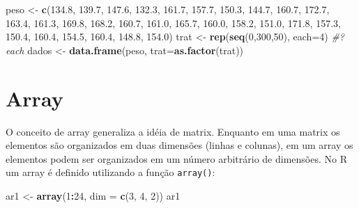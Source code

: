 \documentclass[
]{book}
\newenvironment{Shaded}{\begin{snugshade}}{\end{snugshade}}
\newcommand{\CommentTok}[1]{\textcolor[rgb]{0.56,0.35,0.01}{\textit{#1}}}
\newcommand{\DataTypeTok}[1]{\textcolor[rgb]{0.13,0.29,0.53}{#1}}
\newcommand{\DecValTok}[1]{\textcolor[rgb]{0.00,0.00,0.81}{#1}}
\newcommand{\FloatTok}[1]{\textcolor[rgb]{0.00,0.00,0.81}{#1}}
\newcommand{\KeywordTok}[1]{\textcolor[rgb]{0.13,0.29,0.53}{\textbf{#1}}}
\newcommand{\NormalTok}[1]{#1}
\newcommand{\OperatorTok}[1]{\textcolor[rgb]{0.81,0.36,0.00}{\textbf{#1}}}
\newcommand{\StringTok}[1]{\textcolor[rgb]{0.31,0.60,0.02}{#1}}
\begin{document}
\begin{Shaded}
\begin{Highlighting}[]
\NormalTok{peso  <-}\StringTok{ }\KeywordTok{c}\NormalTok{(}\FloatTok{134.8}\NormalTok{, }\FloatTok{139.7}\NormalTok{, }\FloatTok{147.6}\NormalTok{, }\FloatTok{132.3}\NormalTok{, }\FloatTok{161.7}\NormalTok{, }\FloatTok{157.7}\NormalTok{, }\FloatTok{150.3}\NormalTok{, }\FloatTok{144.7}\NormalTok{,}
           \FloatTok{160.7}\NormalTok{, }\FloatTok{172.7}\NormalTok{, }\FloatTok{163.4}\NormalTok{, }\FloatTok{161.3}\NormalTok{, }\FloatTok{169.8}\NormalTok{, }\FloatTok{168.2}\NormalTok{, }\FloatTok{160.7}\NormalTok{, }\FloatTok{161.0}\NormalTok{,}
           \FloatTok{165.7}\NormalTok{, }\FloatTok{160.0}\NormalTok{, }\FloatTok{158.2}\NormalTok{, }\FloatTok{151.0}\NormalTok{, }\FloatTok{171.8}\NormalTok{, }\FloatTok{157.3}\NormalTok{, }\FloatTok{150.4}\NormalTok{, }\FloatTok{160.4}\NormalTok{,}
           \FloatTok{154.5}\NormalTok{, }\FloatTok{160.4}\NormalTok{, }\FloatTok{148.8}\NormalTok{, }\FloatTok{154.0}\NormalTok{)}
\NormalTok{trat  <-}\StringTok{ }\KeywordTok{rep}\NormalTok{(}\KeywordTok{seq}\NormalTok{(}\DecValTok{0}\NormalTok{,}\DecValTok{300}\NormalTok{,}\DecValTok{50}\NormalTok{), }\DataTypeTok{each=}\DecValTok{4}\NormalTok{)  }\CommentTok{#?each}
\NormalTok{dados <-}\StringTok{  }\KeywordTok{data.frame}\NormalTok{(peso, }\DataTypeTok{trat=}\KeywordTok{as.factor}\NormalTok{(trat))}
\end{Highlighting}
\end{Shaded}

\hypertarget{array}{%
\section{Array}\label{array}}

O conceito de array generaliza a idéia de matrix. Enquanto em uma matrix os elementos são organizados em duas dimensões (linhas e colunas), em um array os elementos podem ser organizados em um número arbitrário de dimensões.
No R um array é definido utilizando a função \texttt{array()}:

\begin{Shaded}
\begin{Highlighting}[]
\NormalTok{ar1 <-}\StringTok{ }\KeywordTok{array}\NormalTok{(}\DecValTok{1}\OperatorTok{:}\DecValTok{24}\NormalTok{, }\DataTypeTok{dim =} \KeywordTok{c}\NormalTok{(}\DecValTok{3}\NormalTok{, }\DecValTok{4}\NormalTok{, }\DecValTok{2}\NormalTok{)) }
\NormalTok{ar1}
\end{Highlighting}
\end{Shaded}
\end{document}
